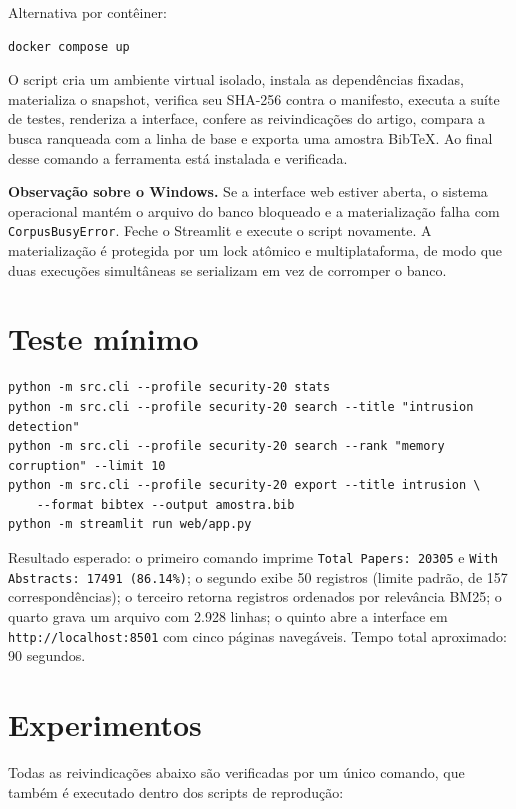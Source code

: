 \documentclass[12pt]{article}
\begin{document}
\noindent Alternativa por contêiner:
\begin{verbatim}
docker compose up
\end{verbatim}

O script cria um ambiente virtual isolado, instala as dependências fixadas,
materializa o snapshot, verifica seu SHA-256 contra o manifesto, executa a suíte
de testes, renderiza a interface, confere as reivindicações do artigo, compara a
busca ranqueada com a linha de base e exporta uma amostra BibTeX. Ao final desse
comando a ferramenta está instalada e verificada.

\textbf{Observação sobre o Windows.} Se a interface web estiver aberta, o sistema
operacional mantém o arquivo do banco bloqueado e a materialização falha com
\texttt{CorpusBusyError}. Feche o Streamlit e execute o script novamente. A
materialização é protegida por um lock atômico e multiplataforma, de modo que
duas execuções simultâneas se serializam em vez de corromper o banco.

\section{Teste mínimo}

\begin{verbatim}
python -m src.cli --profile security-20 stats
python -m src.cli --profile security-20 search --title "intrusion detection"
python -m src.cli --profile security-20 search --rank "memory corruption" --limit 10
python -m src.cli --profile security-20 export --title intrusion \
    --format bibtex --output amostra.bib
python -m streamlit run web/app.py
\end{verbatim}

\noindent Resultado esperado: o primeiro comando imprime
\texttt{Total Papers: 20305} e \texttt{With Abstracts: 17491 (86.14\%)}; o
segundo exibe 50 registros (limite padrão, de 157 correspondências); o terceiro
retorna registros ordenados por relevância BM25; o quarto grava um arquivo com
2.928 linhas; o quinto abre a interface em \texttt{http://localhost:8501} com
cinco páginas navegáveis. Tempo total aproximado: 90 segundos.

\section{Experimentos}

Todas as reivindicações abaixo são verificadas por um único comando, que também
é executado dentro dos scripts de reprodução:
\end{document}
